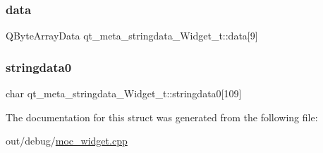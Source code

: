 \subsubsection{\texorpdfstring{data}{data}}
{\footnotesize\ttfamily Q\+Byte\+Array\+Data qt\+\_\+meta\+\_\+stringdata\+\_\+\+Widget\+\_\+t\+::data\mbox{[}9\mbox{]}}

\mbox{\label{structqt__meta__stringdata___widget__t_ad8f819353744095c83629eddef74ccc8}} 
\subsubsection{\texorpdfstring{stringdata0}{stringdata0}}
{\footnotesize\ttfamily char qt\+\_\+meta\+\_\+stringdata\+\_\+\+Widget\+\_\+t\+::stringdata0\mbox{[}109\mbox{]}}



The documentation for this struct was generated from the following file\+:\begin{DoxyCompactItemize}
\item 
out/debug/\mbox{\hyperlink{moc__widget_8cpp}{moc\+\_\+widget.\+cpp}}\end{DoxyCompactItemize}

